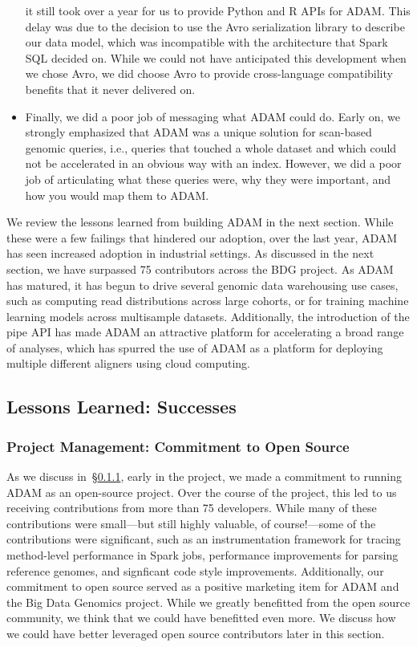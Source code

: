 \documentclass[phd]{ucbthesis}
\begin{document}
\begin{itemize}
  it still took over a year for us to provide Python and R APIs for ADAM. This delay
  was due to the decision to use the Avro serialization library to describe our
  data model, which was incompatible with the architecture that Spark SQL
  decided on. While we could not have anticipated this development when we chose
  Avro, we did choose Avro to provide cross-language compatibility benefits that
  it never delivered on.
\item Finally, we did a poor job of messaging what ADAM could do. Early on, we
  strongly emphasized that ADAM was a unique solution for scan-based genomic
  queries, i.e., queries that touched a whole dataset and which could not be
  accelerated in an obvious way with an index. However, we did a poor job of
  articulating what these queries were, why they were important, and how you
  would map them to ADAM.
\end{itemize}

We review the lessons learned from building ADAM in the next section.
While these were a few failings that hindered our adoption, over the last year,
ADAM has seen increased adoption in industrial settings. As discussed in the
next section, we have surpassed 75 contributors across the BDG project.
As ADAM has matured, it has begun to drive several genomic data warehousing
use cases, such as computing read distributions across large cohorts, or for
training machine learning models across multisample datasets. Additionally, the
introduction of the pipe API has made ADAM an attractive platform for
accelerating a broad range of analyses, which has spurred the use of ADAM as a
platform for deploying multiple different aligners using cloud computing.

\subsection{Lessons Learned: Successes}
\label{sec:successes}

\subsubsection{Project Management: Commitment to Open Source}
\label{sec:win-oss}

As we discuss in~\S\ref{sec:win-oss}, early in the project, we made a commitment
to running ADAM as an open-source project. Over the course of the project, this
led to us receiving contributions from more than 75 developers. While many of
these contributions were small---but still highly valuable, of course!---some of
the contributions were significant, such as an instrumentation framework for
tracing method-level performance in Spark jobs, performance improvements for
parsing reference genomes, and signficant code style improvements. Additionally,
our commitment to open source served as a positive marketing item for ADAM and
the Big Data Genomics project. While we greatly benefitted from the open source
community, we think that we could have benefitted even more. We discuss how we
could have better leveraged open source contributors later in this section.
\end{document}
